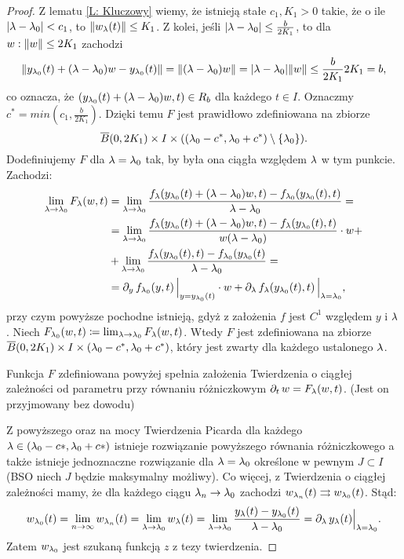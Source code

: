 \begin{proof}
  Z lematu \ref{L: Kluczowy} wiemy, że istnieją stałe $c_1, K_1 > 0$ takie, że o ile $\abs{ \l - \l_0 } < c_1$, 
  to $\norm{ w_\l(t) } \le K_1$. Z kolei, jeśli $\abs{ \l - \l_0 } \le \frac{ b }{ 2K_1 }$, 
  to dla $w : \lVert w \rVert \le 2K_1$ zachodzi
%
  \begin{equation*}
    \norm{ y_{\l_0}(t) + (\l - \l_0)w - y_{\l_0}(t) } = \norm { (\l - \l_0)w  } = \abs{ \l - \l_0 } \norm{ w } \le
    \frac{ b }{ 2K_1 } 2K_1 = b ,
  \end{equation*}
%
  co oznacza, że $( y_{\l_0}(t) + (\l - \l_0)w, t) \in R_b$ dla każdego $t \in I$. Oznaczmy $c^* = min(c_1, \frac{ b }{ 
  2K_1 } )$. Dzięki temu $F$ jest prawidłowo zdefiniowana na zbiorze
%
  \begin{equation*}
    \overline{B}(0, 2K_1) \times I \times ( (\l_0 - c^*, \l_0 + c^*) \setminus \{ \l_0 \} ) \text{.}
  \end{equation*}
%
Dodefiniujemy $F$ dla $\l = \l_0$ tak, by była ona ciągła względem $\l$ w tym punkcie. Zachodzi:
%
  \begin{align*}
    \lim_{\l \to \l_0} F_\l(w, t) &= \lim_{\l \to \l_0} \frac{ f_\l(y_{\l_0}(t) + (\l - \l_0)w, t) -  
    f_{\l_0}(y_{\l_0}(t), t) }{ \l - \l_0 } = \\
    &=  \lim_{\l \to \l_0} \frac{ f_\l(y_{\l_0}(t) + (\l - \l_0)w, t) -  f_\l (y_{\l_0}(t), t) }{ w(\l - \l_0) } \cdot 
    w 
    + \\
    &+ \lim_{\l \to \l_0} \frac{ f_\l(y_{\l_0}(t), t) -  f_{\l_0}(y_{\l_0}(t) }{ \l - \l_0 } = \\
    &= \pd{ y } f_{\l_0} (y, t) \, \Big\vert_{ y = y_{\l_0}(t) } \cdot w + \pd{ \l } f_{\l}( y_{\l_0}(t), t) \, 
    \Big\vert_{ \l = \l_0 } \text{,}
  \end{align*}
%
  przy czym powyższe pochodne istnieją, gdyż z założenia $f$ jest $C^1$ względem $y$ i $\l$. Niech $F_{\l_0}(w, t) 
  \coloneqq \lim_{\l \to \l_0} F_\l(w, t)$. Wtedy $F$ jest zdefiniowana na zbiorze $\overline{B}(0, 2K_1) \times I 
  \times (\l_0 - c^*, \l_0 + c^*)$, który jest zwarty dla każdego ustalonego $\l$.
%
  \begin{nestedlemma}
    Funkcja $F$ zdefiniowana powyżej spełnia założenia Twierdzenia o ciągłej zależności od parametru przy równaniu 
    różniczkowym $\pd{t} w = F_\l(w, t)$. (Jest on przyjmowany bez dowodu)
  \end{nestedlemma}
%
  Z powyższego oraz na mocy Twierdzenia Picarda dla każdego $\l \in  (\l_0 - c*, \l_0 + c*)$ istnieje rozwiązanie
  powyższego równania różniczkowego a także istnieje jednoznaczne rozwiązanie dla $\l = \l_0$ określone
  w pewnym $J \subset I$ (BSO niech $J$ będzie maksymalny możliwy). Co więcej, z Twierdzenia
  o ciągłej zależności mamy, że dla każdego ciągu $\l_n \to \l_0$ zachodzi $w_{\l_n}(t) \rightrightarrows w_{\l_0}(t)$.
  Stąd:
%
  \begin{equation*}
    w_{\l_0}(t) = \lim_{n \to \infty} w_{\l_n}(t) = \lim_{\l \to \l_0} w_{\l}(t) = \lim_{\l \to \l_0} \frac{ y_\l(t) - 
    y_{\l_0}(t) }{ \l - \l_0 } = \pd{ \l } y_\l(t) \Big\vert_{ \l = \l_0 } \text{.}
  \end{equation*}
%
Zatem $w_{\l_0}$ jest szukaną funkcją $z$ z tezy twierdzenia.


\end{proof}

